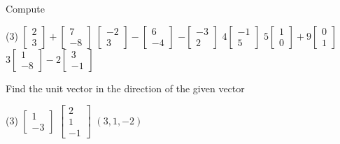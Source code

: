\begin{exercise}
Compute
\begin{tasks}(3)
\task
$\begin{bmatrix}
2 \\
3 
\end{bmatrix}
+
\begin{bmatrix}
7 \\
-8
\end{bmatrix}
$
\task
$\begin{bmatrix}
-2 \\
3 
\end{bmatrix}
-
\begin{bmatrix}
6 \\
-4
\end{bmatrix}
$
\task
$
-\begin{bmatrix}
-3 \\
2 
\end{bmatrix}
$
\task
$
4\begin{bmatrix}
-1 \\
5 
\end{bmatrix}
$
\task
$
5\begin{bmatrix}
1 \\
0 
\end{bmatrix}
+
9
\begin{bmatrix}
0 \\
1
\end{bmatrix}
$
\task
$
3\begin{bmatrix}
1 \\
-8 
\end{bmatrix}
-
2
\begin{bmatrix}
3 \\
-1
\end{bmatrix}
$
\end{tasks}
\end{exercise}

\begin{exercise}
Find the unit vector in the direction of the given vector
\begin{tasks}(3)
\task
$\begin{bmatrix}
1 \\
-3 
\end{bmatrix}
$
\task
$\begin{bmatrix}
2 \\
1 \\
-1
\end{bmatrix}
$
\task
$(3,1,-2)$
\end{tasks}
\end{exercise}

